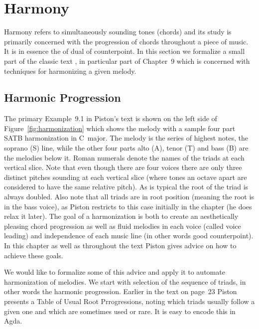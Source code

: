 \section{Harmony}
\label{sec:harmony}

Harmony refers to simultaneously sounding tones (chords) and its study
is primarily concerned with the progression of chords throughout a
piece of music. It is in essence the of dual of counterpoint. In this
section we formalize a small part of the classic text
\citet{piston-harmony}, in particular part of Chapter~9 which is
concerned with techniques for harmonizing a given melody.

\subsection{Harmonic Progression}
\label{sec:harmony:prog}

The primary Example~9.1 in Piston's text is shown on the left
side of Figure~\ref{fig:harmonization} which shows the melody with a
sample four part SATB harmonization in C~major. The melody is the
series of highest notes, the soprano (S) line, while the other four
parts alto (A), tenor (T) and bass (B) are the melodies below
it. Roman numerals denote the names of the triads at each vertical
slice. Note that even though there are four voices there are only
three distinct pitches sounding at each vertical slice (where tones an
octave apart are considered to have the same relative pitch). As is
typical the root of the triad is always doubled. Also note that all
triads are in root position (meaning the root is in the bass voice),
as Piston restricts to this case initially in the chapter (he does
relax it later). The goal of a harmonization is both to create an
aesthetically pleasing chord progression as well as fluid melodies in
each voice (called voice leading) and independence of each music
line (in other words good counterpoint). In this chapter as well as
throughout the text Piston gives advice on how to achieve these goals.

\Harmonization

We would like to formalize some of this advice and apply it to
automate harmonization of melodies. We start with selection of the
sequence of triads, in other words the harmonic progression. Earlier
in the text on page~23 Piston presents a Table of Usual Root
Prrogressions, noting which triads usually follow a given one and
which are sometimes used or rare. It is easy to encode this in Agda.

